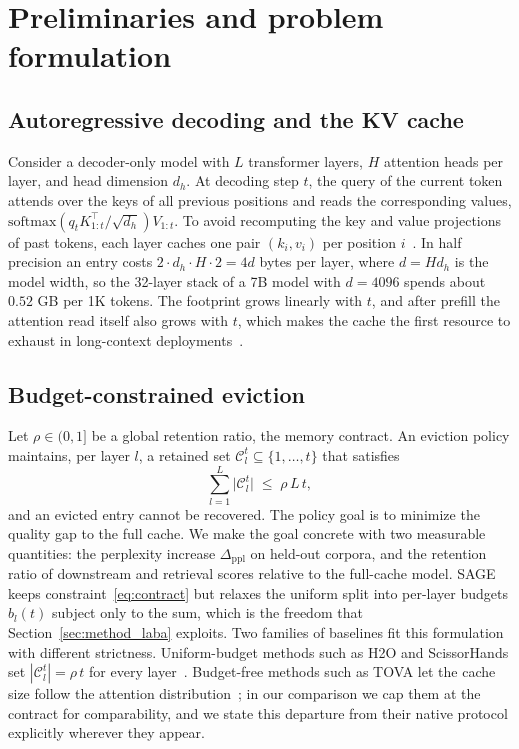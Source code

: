 \section{Preliminaries and problem formulation}\label{sec:prelim}

\subsection{Autoregressive decoding and the KV cache}

Consider a decoder-only model with $L$ transformer layers, $H$ attention
heads per layer, and head dimension $d_h$. At decoding step $t$, the
query of the current token attends over the keys of all previous
positions and reads the corresponding values,
$\mathrm{softmax}(q_t K_{1:t}^{\top}/\sqrt{d_h}) V_{1:t}$. To avoid
recomputing the key and value projections of past tokens, each layer
caches one pair $(k_i, v_i)$ per position
$i$~\cite{shazeer2019fast,vaswani2017attention}. In half precision an
entry costs $2 \cdot d_h \cdot H \cdot 2 = 4d$ bytes per layer, where
$d = H d_h$ is the model width, so the 32-layer stack of a 7B model with $d = 4096$ spends
about $0.52$ GB per 1K tokens. The footprint grows
linearly with $t$, and after prefill the attention read itself also
grows with $t$, which makes the cache the first resource to exhaust in
long-context deployments~\cite{pope2023efficiently}.

\subsection{Budget-constrained eviction}

Let $\rho \in (0,1]$ be a global retention ratio, the memory contract.
An eviction policy maintains, per layer $l$, a retained set
$\mathcal{C}_l^{t} \subseteq \{1,\dots,t\}$ that satisfies
\begin{equation}\label{eq:contract}
  \sum_{l=1}^{L} \bigl|\mathcal{C}_l^{t}\bigr|
  \;\le\; \rho\, L\, t,
\end{equation}
and an evicted entry cannot be recovered. The policy goal is to
minimize the quality gap to the full cache. We make the goal concrete
with two measurable quantities: the perplexity increase
$\Delta_{\mathrm{ppl}}$ on held-out corpora, and the retention ratio of
downstream and retrieval scores relative to the full-cache model.
SAGE keeps constraint~\eqref{eq:contract} but relaxes the uniform split
into per-layer budgets $b_l(t)$ subject only to the sum, which is the
freedom that Section~\ref{sec:method_laba} exploits. Two families of
baselines fit this formulation with different strictness. Uniform-budget
methods such as H2O and ScissorHands set
$|\mathcal{C}_l^{t}| = \rho\, t$ for every
layer~\cite{zhang2023h2o,liu2023scissorhands}. Budget-free methods
such as TOVA let the cache size follow the attention
distribution~\cite{PLACEHOLDER_oren2024tova_verify}; in our comparison
we cap them at the contract for comparability, and we state this
departure from their native protocol explicitly wherever they
appear.

